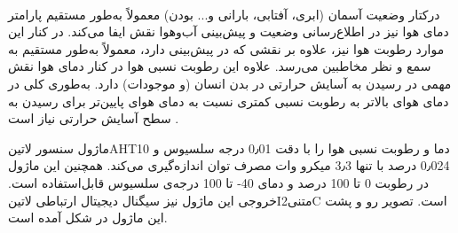 ‌

درکتار وضعیت آسمان (ابری، آفتابی، بارانی و... بودن) معمولاً به‌طور مستقیم پارامتر دمای هوا نیز در اطلاع‌رسانی وضعیت و پیش‌بینی آب‌وهوا نقش ایفا می‌کند. در کنار این موارد رطوبت هوا نیز، علاوه بر نقشی که در پیش‌بینی دارد، معمولاً به‌طور مستقیم به سمع و نظر مخاطبین می‌رسد. علاوه این رطوبت نسبی هوا در کنار دمای هوا نقش مهمی در رسیدن به آسایش حرارتی در بدن انسان (و موجودات) دارد. به‌طوری کلی در دمای هوای بالاتر به رطوبت نسبی کمتری نسبت به دمای هوای پایین‌تر برای رسیدن به سطح آسایش  حرارتی نیاز است . 

ماژول سنسور ‌لاتین{AHT10} دما و رطوبت نسبی هوا را با دقت 0٫01 درجه سلسیوس و 0٫024 درصد با تنها 3٫3 میکرو وات مصرف توان اندازه‌گیری می‌کند. همچنین این ماژول در رطوبت 0 تا 100 درصد و دمای  40- تا 100 درجه‌ی سلسیوس قابل‌استفاده است. خروجی این ماژول نیز سیگنال دیجیتال ارتباطی ‌لاتین{I‌متنی{2}C} است. تصویر رو و پشت این ماژول در شکل  آمده است.

